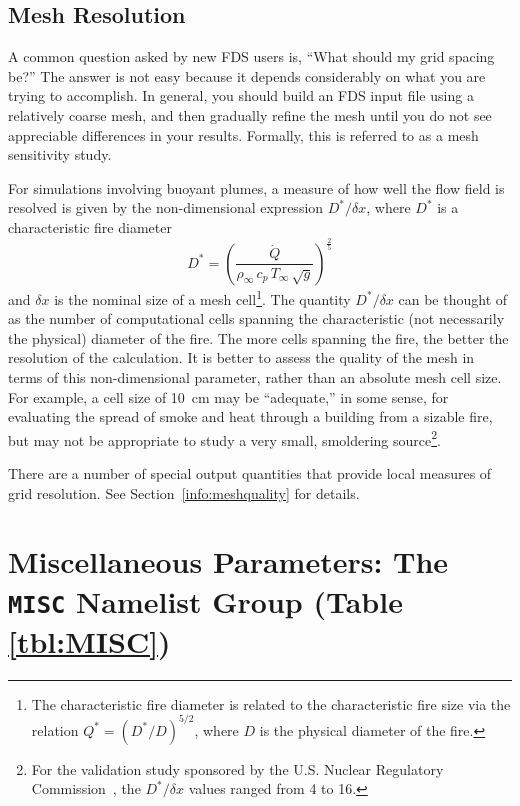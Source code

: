\documentclass[11pt]{book}
\newcommand{\dx}{\delta x}
\newcommand{\dQ}{\dot{Q}}
\newcommand{\be}{\begin{equation}}
\newcommand{\ee}{\end{equation}}
\begin{document}
\subsection{Mesh Resolution}

A common question asked by new FDS users is, ``What should my grid spacing be?''
The answer is not easy because it depends considerably on what you are trying
to accomplish. In general, you should build an FDS input file using a relatively
coarse mesh, and then gradually refine the mesh until you do not see
appreciable differences in your results. Formally, this is referred to as a mesh sensitivity study.

For simulations involving buoyant plumes, a measure of how well the flow field is resolved is given by the
non-dimensional expression $D^*/\dx$, where $D^*$ is a characteristic
fire diameter
\be D^* = \left(
     \frac{\dQ}{\rho_\infty \, c_p \, T_\infty \, \sqrt{g} }
     \right)^\frac{2}{5}  \ee
and $\dx$ is the nominal size of a mesh cell\footnote{The characteristic
fire diameter is related to the characteristic fire size via the
relation $Q^* = (D^*/D)^{5/2}$, where $D$ is the physical diameter of the
fire.}. The quantity $D^*/\dx$ can be thought of as the number of computational cells
spanning the characteristic (not necessarily the physical) diameter of the fire.
The more cells spanning the fire, the better the resolution of the
calculation. It is better to assess the quality of the mesh in terms
of this non-dimensional parameter, rather than an absolute mesh cell size.
For example, a cell size of 10~cm may be ``adequate,'' in some sense,
for evaluating the spread of smoke and heat through a building from a
sizable fire, but may not be appropriate to study a very small, smoldering source\footnote{For the validation study sponsored by the
U.S. Nuclear Regulatory Commission~\cite{NUREG_1824}, the $D^*/\dx$ values ranged from 4 to 16.}.

\begin{warning}
\noindent
There are a number of special output quantities that provide local measures of grid resolution. See Section~\ref{info:meshquality} for details.
\end{warning}



\clearpage
\section{Miscellaneous Parameters: The \texorpdfstring{{\tt MISC}}{MISC} Namelist Group (Table \ref{tbl:MISC})}
\label{info:MISC}
\end{document}
